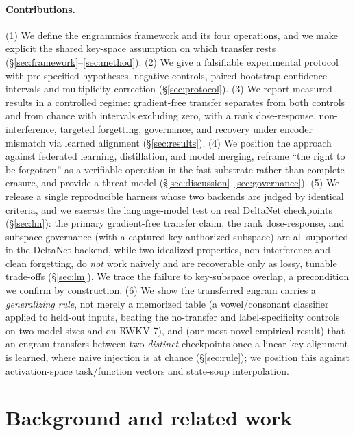 \documentclass[11pt]{article}
\theoremstyle{definition}
\begin{document}
\paragraph{Contributions.}
(1) We define the engrammics framework and its four operations, and we make explicit the shared key-space assumption on which transfer rests (\S\ref{sec:framework}--\ref{sec:method}). (2) We give a falsifiable experimental protocol with pre-specified hypotheses, negative controls, paired-bootstrap confidence intervals and multiplicity correction (\S\ref{sec:protocol}). (3) We report measured results in a controlled regime: gradient-free transfer separates from both controls and from chance with intervals excluding zero, with a rank dose-response, non-interference, targeted forgetting, governance, and recovery under encoder mismatch via learned alignment (\S\ref{sec:results}). (4) We position the approach against federated learning, distillation, and model merging, reframe ``the right to be forgotten'' as a verifiable operation in the fast substrate rather than complete erasure, and provide a threat model (\S\ref{sec:discussion}--\ref{sec:governance}). (5) We release a single reproducible harness whose two backends are judged by identical criteria, and we \emph{execute} the language-model test on real DeltaNet checkpoints (\S\ref{sec:lm}): the primary gradient-free transfer claim, the rank dose-response, and subspace governance (with a captured-key authorized subspace) are all supported in the DeltaNet backend, while two idealized properties, non-interference and clean forgetting, do \emph{not} work naively and are recoverable only as lossy, tunable trade-offs (\S\ref{sec:lm}). We trace the failure to key-subspace overlap, a precondition we confirm by construction. (6) We show the transferred engram carries a \emph{generalizing rule}, not merely a memorized table (a vowel/consonant classifier applied to held-out inputs, beating the no-transfer and label-specificity controls on two model sizes and on RWKV-7), and (our most novel empirical result) that an engram transfers between two \emph{distinct} checkpoints once a linear key alignment is learned, where naive injection is at chance (\S\ref{sec:rule}); we position this against activation-space task/function vectors and state-soup interpolation.

\section{Background and related work}
\end{document}
